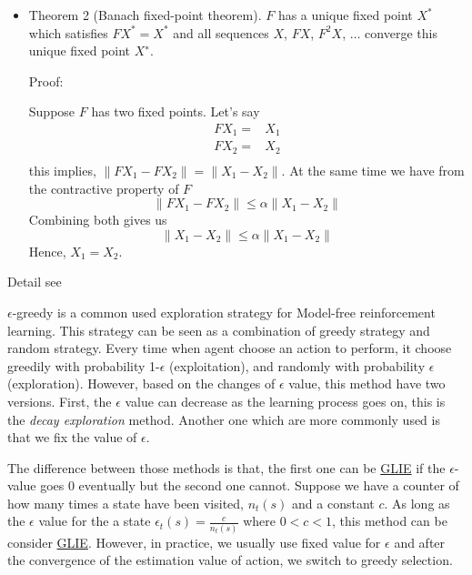 \documentclass[9pt]{article}
\begin{document}
\begin{itemize}
\item Theorem 2 (Banach fixed-point theorem). $F$ has a unique fixed point $X^*$ which satisfies $FX^* = X^*$ and all
sequences $X$, $FX$, $F^2X$, $\ldots$ converge this unique fixed point $X^∗$.

Proof:

Suppose $F$ has two fixed points. Let's say
\begin{displaymath}
  \begin{split}
  FX_1 = & X_1\\
  FX_2 = & X_2\\
  \end{split}
\end{displaymath}
this implies, $\| FX_1 - FX_2\| = \| X_1-X_2 \|$. At the same time we have from the contractive property of $F$ 
\begin{displaymath}
  \|FX_1-FX_2\| \le \alpha \|X_1-X_2\|
\end{displaymath}
Combining both gives us 
\[
\|X_1-X_2\| \le \alpha\|X_1-X_2\|
\]
Hence, $X_1=X_2$.
\end{itemize}

Detail see \cite{conrad2014contraction}





$\epsilon$-greedy is a common used exploration strategy for Model-free reinforcement learning. This strategy can be seen as a combination of greedy strategy and random strategy. Every time when agent choose an action to perform, it choose greedily with probability 1-$\epsilon$ (exploitation), and randomly with probability $\epsilon$ (exploration). However, based on the changes of $\epsilon$ value, this method have two versions. First, the $\epsilon$ value can decrease as the learning process goes on, this is the \textit{decay exploration} method. Another one which are more commonly used is that we fix the value of $\epsilon$. 

The difference between those methods is that, the first one can be \hyperlink{glie}{GLIE} if the $\epsilon$-value goes 0 eventually but the second one cannot. Suppose we have a counter of how many times a state have been visited, $n_t(s)$ and a constant $c$. As long as the $\epsilon$ value for the a state $\epsilon_t(s) = \frac{c}{n_t(s)}$ where $0<c<1$, this method can be consider \hyperlink{glie}{GLIE}. However, in practice, we usually use fixed value for $\epsilon$ and after the convergence of the estimation value of action, we switch to greedy selection. 
\end{document}
